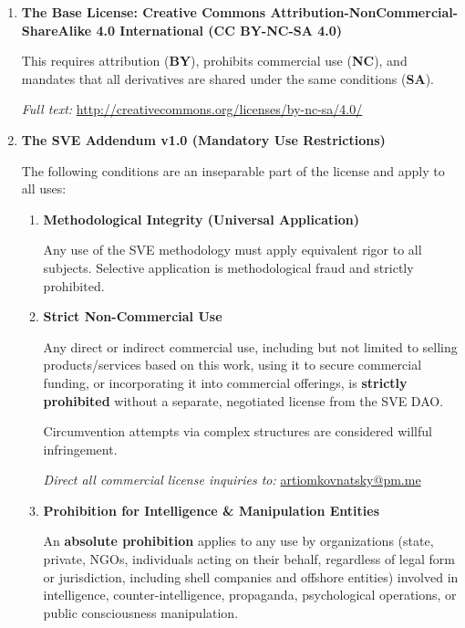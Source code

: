 \documentclass[10pt,a4paper]{article}
\begin{document}
\begin{enumerate}[label=\textbf{\Alph*.}, leftmargin=*, itemsep=1em]
    \item \textbf{The Base License: Creative Commons Attribution-NonCommercial-ShareAlike 4.0 International (CC BY-NC-SA 4.0)}
    
    This requires attribution (\textbf{BY}), prohibits commercial use (\textbf{NC}), and mandates that all derivatives are shared under the same conditions (\textbf{SA}).
    
    \textit{Full text:} \href{http://creativecommons.org/licenses/by-nc-sa/4.0/}{http://creativecommons.org/licenses/by-nc-sa/4.0/}

    \item \textbf{The SVE Addendum v1.0 (Mandatory Use Restrictions)}
    
    The following conditions are an inseparable part of the license and apply to all uses:
    
    \begin{enumerate}[label=\textbf{\arabic*.}, leftmargin=*, itemsep=1em]
        \item \textbf{Methodological Integrity (Universal Application)}
        
        Any use of the SVE methodology must apply equivalent rigor to all subjects. Selective application is methodological fraud and strictly prohibited.

        \item \textbf{Strict Non-Commercial Use}
        
        Any direct or indirect commercial use, including but not limited to selling products/services based on this work, using it to secure commercial funding, or incorporating it into commercial offerings, is \textbf{strictly prohibited} without a separate, negotiated license from the SVE DAO.
        
        Circumvention attempts via complex structures are considered willful infringement.
        
        \textit{Direct all commercial license inquiries to:} \href{mailto:artiomkovnatsky@pm.me}{artiomkovnatsky@pm.me}

        \item \textbf{Prohibition for Intelligence \& Manipulation Entities}
        
        An \textbf{absolute prohibition} applies to any use by organizations (state, private, NGOs, individuals acting on their behalf, regardless of legal form or jurisdiction, including shell companies and offshore entities) involved in intelligence, counter-intelligence, propaganda, psychological operations, or public consciousness manipulation.
        

\end{enumerate}
\end{enumerate}
\end{document}
